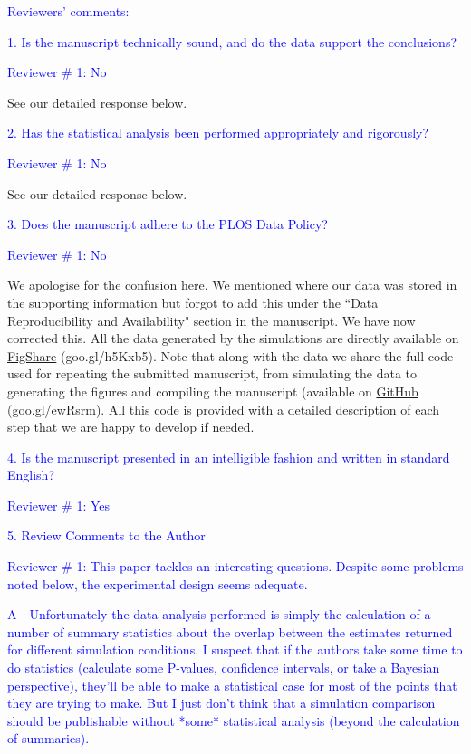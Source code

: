 \documentclass[11pt]{letter}
\begin{document}
\begin{letter}{}
\textcolor{blue}{Reviewers' comments:}

\textcolor{blue}{1. Is the manuscript technically sound, and do the data support the conclusions?}

\textcolor{blue}{Reviewer $\#$ 1: No}

See our detailed response below.

\textcolor{blue}{2. Has the statistical analysis been performed appropriately and rigorously?}

\textcolor{blue}{Reviewer $\#$ 1: No}

See our detailed response below.

\textcolor{blue}{3. Does the manuscript adhere to the PLOS Data Policy?}

\textcolor{blue}{Reviewer $\#$ 1: No}

We apologise for the confusion here. We mentioned where our data was stored in the supporting information but forgot to add this under the ``Data Reproducibility and Availability" section in the manuscript. We have now corrected this. All the data generated by the simulations are directly available on \href{http://figshare.com/articles/Effect_of_missing_data_on_topological_inference_using_a_total_evidence_approach/1306861}{FigShare} (goo.gl/h5Kxb5). Note that along with the data we share the full code used for repeating the submitted manuscript, from simulating the data to generating the figures and compiling the manuscript (available on \href{https://github.com/TGuillerme/Total_Evidence_Method-Missing_data}{GitHub} (goo.gl/ewRsrm). All this code is provided with a detailed description of each step that we are happy to develop if needed.

\textcolor{blue}{4. Is the manuscript presented in an intelligible fashion and written in standard English?}

\textcolor{blue}{Reviewer $\#$ 1: Yes}

\textcolor{blue}{5. Review Comments to the Author}

\textcolor{blue}{Reviewer $\#$ 1: This paper tackles an interesting questions. Despite some problems noted below, the experimental design seems adequate.}


\textcolor{blue}{A - Unfortunately the data analysis performed is simply the calculation of a number of summary statistics about the overlap between the estimates returned for different simulation conditions. I suspect that if the authors take some time to do statistics (calculate some P-values, confidence intervals, or take a Bayesian perspective), they'll be able to make a statistical case for most of the points that they are trying to make. But I just don't think that a simulation comparison should be publishable without *some* statistical analysis (beyond the calculation of summaries).}


\end{letter}
\end{document}
